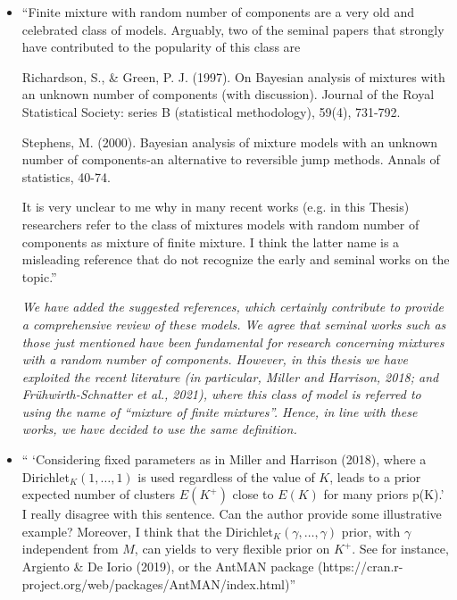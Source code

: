 \documentclass[11pt]{letter}
\begin{document}
\begin{itemize}
{\em 
	We thank the Evaluator for the useful indication, we corrected the notation accordingly.
}
\vskip3mm

%
\item ``Finite mixture with random number of components are a very old and celebrated class of models. Arguably, two of the seminal papers that strongly have contributed to the popularity of this class are

Richardson, S., \& Green, P. J. (1997). On Bayesian analysis of mixtures with an unknown number of components (with discussion). Journal of the Royal Statistical Society: series B (statistical methodology), 59(4), 731-792.

Stephens, M. (2000). Bayesian analysis of mixture models with an unknown number of components-an
alternative to reversible jump methods. Annals of statistics, 40-74.

It is very unclear to me why in many recent works (e.g. in this Thesis) researchers refer to the class of mixtures models with random number of components as mixture of finite mixture. I think the latter name is a misleading reference that do not recognize the early and seminal works on the topic.''\vskip1mm

{\em 
	We have added the suggested references, which certainly contribute to provide a comprehensive review of these models.
	We agree that seminal works such as those just mentioned have been fundamental for research concerning mixtures with a random number of components. However, in this thesis we have exploited the recent literature (in particular, Miller and Harrison, 2018; and Fr\"uhwirth-Schnatter et al., 2021), where this class of model is referred to using the name of ``mixture of finite mixtures''. Hence, in line with these works, we have decided to use the same definition.
}
\vskip3mm

%
\item `` `Considering fixed parameters as in Miller and Harrison (2018), where a Dirichlet$_K(1,\dots, 1)$ is used regardless of the value of $K$, leads to a prior expected number of clusters $E(K^+)$ close to $E(K)$ for many priors p(K).'\\
I really disagree with this sentence. Can the author provide some illustrative example? Moreover, I think that the Dirichlet$_K(\gamma,\dots, \gamma)$ prior, with $\gamma$ independent from $M$, can yields to very flexible prior on $K^+$. See for instance, Argiento \& De Iorio (2019), or the AntMAN package (https://cran.r-
project.org/web/packages/AntMAN/index.html)''\vskip1mm


\end{itemize}
\end{document}
